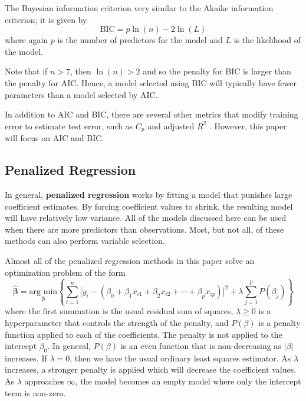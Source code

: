 \documentclass{article}
\newcommand{\argmin}[2]{\underset{#1}{\text{arg min}}\left\{#2\right\}}
\begin{document}
The Bayesian information criterion very similar to the Akaike information criterion; it is given by
\begin{equation}
	\text{BIC} = p\ln(n) - 2\ln(L)
\end{equation}
where again $p$ is the number of predictors for the model and $L$ is the likelihood of the model.

Note that if $n>7$, then $\ln(n)>2$ and so the penalty for BIC is larger than the penalty for AIC. Hence, a model selected using BIC will typically have fewer parameters than a model selected by AIC.

In addition to AIC and BIC, there are several other metrics that modify training error to estimate test error, such as $C_p$ and adjusted $R^2$ \cite{james2013introduction}. However, this paper will focus on AIC and BIC.
\subsection{Penalized Regression}

In general, \textbf{penalized regression} works by fitting a model that punishes large coefficient estimates. By forcing coefficient values to shrink, the resulting model will have relatively low variance. All of the models discussed here can be used when there are more predictors than observations. Most, but not all, of these methods can also perform variable selection.

Almost all of the penalized regression methods in this paper solve an optimization problem of the form
\begin{equation}\label{eqn:penalized-regression-lambda}
	\hat{\bm{\beta}}=\argmin{\bm{\beta}}{\sum\limits_{i = 1}^n \Big[y_i - (\beta_0 + \beta_1 x_{i1} + \beta_2 x_{i2} + \cdots + \beta_p x_{ip})\Big]^2 + \lambda\sum\limits_{j = 1}^p P(\beta_j)}
\end{equation}
where the first summation is the usual residual sum of squares, $\lambda\geq 0$ is a hyperparameter that controls the strength of the penalty, and $P(\beta)$ is a penalty function applied to each of the coefficients. The penalty is not applied to the intercept $\beta_0$. In general, $P(\beta)$ is an even function that is non-decreasing as $\vert \beta \vert$ increases. If $\lambda = 0$, then we have the usual ordinary least squares estimator. As $\lambda$ increases, a stronger penalty is applied which will decrease the coefficient values. As $\lambda$ approaches $\infty$, the model becomes an empty model where only the intercept term is non-zero.
\end{document}
